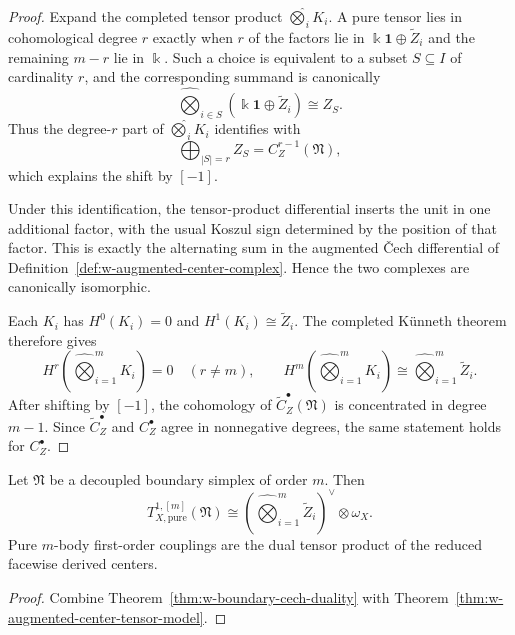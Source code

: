 \begin{proof}
Expand the completed tensor product $\widehat\bigotimes_i K_i$. A pure tensor lies in cohomological
degree $r$ exactly when $r$ of the factors lie in $\Bbbk\mathbf{1}\oplus \widetilde Z_i$ and the remaining
$m-r$ lie in $\Bbbk$. Such a choice is equivalent to a subset $S\subseteq I$ of cardinality $r$, and the
corresponding summand is canonically
\[
\widehat\bigotimes_{i\in S}(\Bbbk\mathbf{1}\oplus \widetilde Z_i)
\cong Z_S.
\]
Thus the degree-$r$ part of $\widehat\bigotimes_i K_i$ identifies with
\[
\bigoplus_{|S|=r} Z_S = C_Z^{r-1}(\mathfrak N),
\]
which explains the shift by $[-1]$.

Under this identification, the tensor-product differential inserts the unit in one additional factor, with
the usual Koszul sign determined by the position of that factor. This is exactly the alternating sum in the
augmented \v{C}ech differential of Definition~\ref{def:w-augmented-center-complex}. Hence the two complexes
are canonically isomorphic.

Each $K_i$ has $H^0(K_i)=0$ and $H^1(K_i)\cong \widetilde Z_i$. The completed K\"unneth theorem therefore gives
\[
H^r\left(\widehat\bigotimes_{i=1}^m K_i\right)=0\quad (r\neq m),
\qquad
H^m\left(\widehat\bigotimes_{i=1}^m K_i\right)
\cong
\widehat\bigotimes_{i=1}^m \widetilde Z_i.
\]
After shifting by $[-1]$, the cohomology of $\widetilde C_Z^\bullet(\mathfrak N)$ is concentrated in degree $m-1$.
Since $\widetilde C_Z^\bullet$ and $C_Z^\bullet$ agree in nonnegative degrees, the same statement holds for
$C_Z^\bullet$.
\end{proof}

\begin{corollary}
\label{cor:w-pure-mbody-coupling-theorem}
Let $\mathfrak N$ be a decoupled boundary simplex of order $m$. Then
\[
T^{1,[m]}_{X,\mathrm{pure}}(\mathfrak N)
\cong
\left(\widehat\bigotimes_{i=1}^m \widetilde Z_i\right)^\vee\otimes \omega_X.
\]
Pure $m$-body first-order couplings are the dual tensor product of the reduced
facewise derived centers.
\end{corollary}

\begin{proof}
Combine Theorem~\ref{thm:w-boundary-cech-duality} with
Theorem~\ref{thm:w-augmented-center-tensor-model}.
\end{proof}

